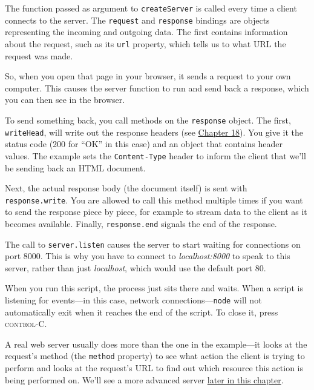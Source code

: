 The function passed as argument to \lstinline`createServer` is called every time a client connects to the server. The \lstinline`request` and \lstinline`response` bindings are objects representing the incoming and outgoing data. The first contains information about the request, such as its \lstinline`url` property, which tells us to what URL the request was made.

So, when you open that page in your browser, it sends a request to your own computer. This causes the server function to run and send back a response, which you can then see in the browser.

To send something back, you call methods on the \lstinline`response` object. The first, \lstinline`writeHead`, will write out the response headers (see \hyperref[http.headers]{Chapter 18}). You give it the status code (200 for ``OK'' in this case) and an object that contains header values. The example sets the \lstinline`Content-Type` header to inform the client that we'll be sending back an HTML document.

Next, the actual response body (the document itself) is sent with \lstinline`response.write`. You are allowed to call this method multiple times if you want to send the response piece by piece, for example to stream data to the client as it becomes available. Finally, \lstinline`response.end` signals the end of the response.

The call to \lstinline`server.listen` causes the server to start waiting for connections on port 8000. This is why you have to connect to \emph{localhost:8000} to speak to this server, rather than just \emph{localhost}, which would use the default port 80.

When you run this script, the process just sits there and waits. When a script is listening for events—in this case, network connections—\lstinline`node` will not automatically exit when it reaches the end of the script. To close it, press \textsc{control}-C.

A real web server usually does more than the one in the example—it looks at the request's method (the \lstinline`method` property) to see what action the client is trying to perform and looks at the request's URL to find out which resource this action is being performed on. We'll see a more advanced server \hyperref[node.file_server]{later in this chapter}.

